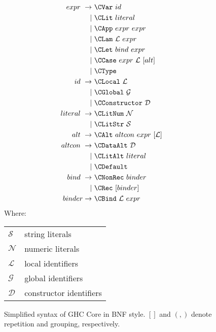 \begin{figure}
  \begin{equation*}
    \begin{split}
      expr\    \rightarrow\ & \CVar\ id                          \\
                         |\ & \CLit\ literal                     \\
                         |\ & \CApp\ expr\ expr                  \\
                         |\ & \CLam\ \mathcal{L}\ expr           \\
                         |\ & \CLet\ bind\ expr                  \\
                         |\ & \CCase\ expr\ \mathcal{L}\ [alt]   \\
                         |\ & \CType                             \\
      id\      \rightarrow\ & \CLocal\       \mathcal{L}         \\
                         |\ & \CGlobal\      \mathcal{G}         \\
                         |\ & \CConstructor\ \mathcal{D}         \\
      literal\ \rightarrow\ & \CLitNum\ \mathcal{N}              \\
                         |\ & \CLitStr\ \mathcal{S}              \\
      alt\     \rightarrow\ & \CAlt\ altcon\ expr\ [\mathcal{L}] \\
      altcon\  \rightarrow\ & \CDataAlt\ \mathcal{D}             \\
                         |\ & \CLitAlt\ literal                  \\
                         |\ & \CDefault                          \\
      bind\    \rightarrow\ & \CNonRec\ binder                   \\
                         |\ & \CRec\ [binder]                    \\
      binder   \rightarrow\ & \CBind\ \mathcal{L}\ expr
    \end{split}
  \end{equation*}
  Where:
  \begin{tabular}[t]{l @{ $=$ } l}
    $\mathcal{S}$ & string literals    \\
    $\mathcal{N}$ & numeric literals   \\
    $\mathcal{L}$ & local identifiers  \\
    $\mathcal{G}$ & global identifiers \\
    $\mathcal{D}$ & constructor identifiers
  \end{tabular}

  \caption{Simplified syntax of GHC Core in BNF style. $[]$ and $(,)$ denote repetition and grouping, respectively.}
  \label{fig:coresyntax}
\end{figure}


